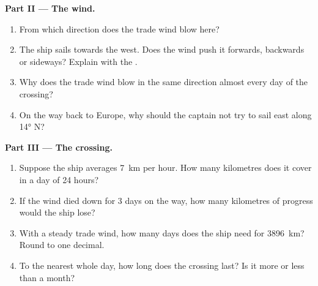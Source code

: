 \begin{problem}
\noindent\textbf{Part II --- The wind.}\par\nopagebreak
\begin{enumerate}[resume, beginpenalty=10000]
  \item From which direction does the trade wind blow here?
  \item The ship sails towards the west. Does the wind push it forwards,
        backwards or sideways? Explain with the .
  \item Why does the trade wind blow in the same direction almost every
        day of the crossing?
  \item On the way back to Europe, why should the captain not try to
        sail east along \ang{14} N?
\end{enumerate}

\noindent\textbf{Part III --- The crossing.}\par\nopagebreak
\begin{enumerate}[resume, beginpenalty=10000]
  \item Suppose the ship averages \qty{7}{km} per hour. How many
        kilometres does it cover in a day of 24 hours?
  \item If the wind died down for 3 days on the way, how many
        kilometres of progress would the ship lose?
  \item With a steady trade wind, how many days does the ship need for
        \qty{3896}{km}? Round to one decimal.
  \item To the nearest whole day, how long does the crossing last? Is
        it more or less than a month?
\end{enumerate}
\end{problem}
